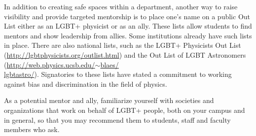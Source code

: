 In addition to creating safe spaces within a department, another way to raise visibility and provide targeted mentorship is to place one's name on a public Out List either as an LGBT+ physicist or as an ally. These lists allow students to find mentors and show leadership from allies. Some institutions already have such lists in place. There are also national lists, such as the LGBT+ Physicists Out List (\href{http://lgbtphysicists.org/outlist.html}{http://lgbtphysicists.org/outlist.html}) and the Out List of LGBT Astronomers (\href{http://web.physics.ucsb.edu/~blaes/lgbtastro/}{http://web.physics.ucsb.edu/$\sim$blaes/\\lgbtastro/}). Signatories to these lists have stated a commitment to working against bias and discrimination in the field of physics.

As a potential mentor and ally, familiarize yourself with societies and organizations that work on behalf of LGBT+ people, both on your campus and in general, so that you may recommend them to students, staff and faculty members who ask.

